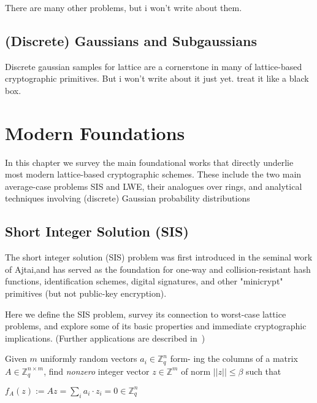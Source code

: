 There are many other problems, but i won't write about them.

\subsection{(Discrete) Gaussians and Subgaussians}
Discrete gaussian samples for  lattice are a cornerstone in many of 
lattice-based cryptographic primitives. But i won't write about it just yet.
treat it like a black box.



\section{Modern Foundations}
In this chapter we survey the main foundational works that directly underlie most modern lattice-based
cryptographic schemes. These include the two main average-case problems SIS and LWE, their analogues
over rings, and analytical techniques involving (discrete) Gaussian probability distributions
\subsection{Short Integer Solution (SIS)}
The short integer solution (SIS) problem was first introduced in the seminal work of Ajtai,and has
served as the foundation for one-way and collision-resistant hash functions, identification schemes, digital
signatures, and other "minicrypt" primitives (but not public-key encryption).

Here we define the SIS problem,
survey its connection to worst-case lattice problems, and explore some of its basic properties and immediate
cryptographic implications. (Further applications are described in~\cite[Chapters 5 and 6]{latticebook})


\begin{definition} 
    Given $m$ uniformly random vectors $a_i\in \mathbb{Z}_q^n$ form-
ing the columns of a matrix $A\in \mathbb{Z}_q^{n\times m}$, find \emph{nonzero}
integer vector $z\in \mathbb{Z}^m$ of norm $||z|| \le \beta$ such that

$f_A(z):=Az=\sum_{i}{a_i \cdot z_i}=0\in \mathbb{Z}_q^n$
\end{definition}


